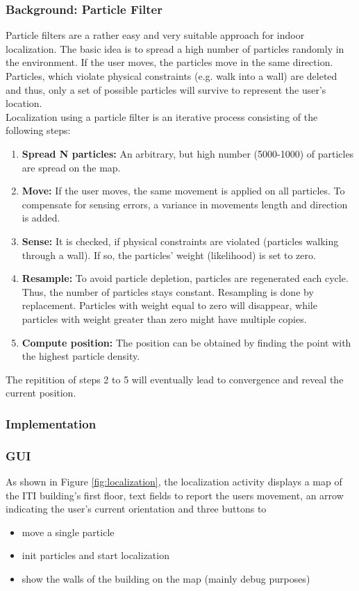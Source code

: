 \documentclass[12pt]{article}
\begin{document}
\subsubsection{Background: Particle Filter} \label{sec:particlefilter}
Particle filters are a rather easy and very suitable approach for indoor localization. The basic idea is to spread a high number of particles randomly in the environment. If the user moves, the particles move in the same direction. Particles, which violate physical constraints (e.g. walk into a wall) are deleted and thus, only a set of possible particles will survive to represent the user's location. \\
Localization using a particle filter is an iterative process consisting of the following steps:
\begin{enumerate}
	\item \textbf{Spread N particles:} An arbitrary, but high number (5000-1000) of particles are spread on the map.
	\item \textbf{Move:} If the user moves, the same movement is applied on all particles. To compensate for sensing errors, a variance in movements length and direction is added.
	\item \textbf{Sense:} It is checked, if physical constraints are violated (particles walking through a wall). If so, the particles' weight (likelihood) is set to zero.
	\item \textbf{Resample:} To avoid particle depletion, particles are regenerated each cycle. Thus, the number of particles stays constant. Resampling is done by replacement. Particles with weight equal to zero will disappear, while particles with weight greater than zero might have multiple copies.
	\item \textbf{Compute position:} The position can be obtained by finding the point with the highest particle density.
\end{enumerate}
The repitition of steps 2 to 5 will eventually lead to convergence and reveal the current position.


\subsubsection{Implementation}
\subsubsection*{GUI}
As shown in Figure \ref{fig:localization}, the localization activity displays a map of the ITI building's first floor, text fields to report the users movement, an arrow indicating the user's current orientation and three buttons to 
\begin{itemize}[noitemsep,topsep=0pt]
	\item move a single particle
	\item init particles and start localization
	\item show the walls of the building on the map (mainly debug purposes)
\end{itemize}
\end{document}
